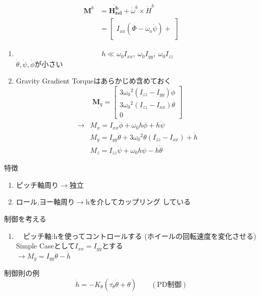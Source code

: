 \documentclass[class=article, crop=false, dvipdfmx]{standalone}
\begin{document}
\begin{align}
\bm{M}^b&=
\dot{\bm{H_{rel}^b}} +
\dot{\omega}^b \times \dot{H}^b\\
&=
\begin{bmatrix}
I_{xx}(\ddot{\Phi} -\omega_o\dot{\psi}) + 
\end{bmatrix}
\end{align}


\begin{enumerate}[label=仮定\maru{\theenumi}]
\item
\begin{equation}
h \ll \omega_0 I_{xx}, \ \omega_0 I_{yy}, \ \omega_0 I_{zz}
\end{equation}
$\dot{\theta}, \dot{\psi}, \dot{\phi}$が小さい

\item
Gravity Gradient Torqueはあらかじめ含めておく
\begin{equation}
\bm{M}_q = 
	\begin{bmatrix}
    3 {\omega_0}^2 (I_{zz} - I_{yy}) \phi \\
    3 {\omega_0}^2 (I_{zz} - I_{xx}) \theta \\
    0
    \end{bmatrix}
\end{equation}
\begin{align}
\rightarrow
& M_x = I_{xx} \ddot{\phi} + \omega_0 h \phi + h \dot{\psi} \\
& M_y = I_{yy} \ddot{\theta} + 3{\omega_0}^2 \theta (I_{zz} - I_{xx}) + \dot{h} \\
& M_z = I_{zz} \ddot{\psi} + \omega_0 h \psi - h \dot{\theta}
\end{align}
\end{enumerate}
特徴
\begin{enumerate}[label=\theenumi)]
\item ピッチ軸周り$\rightarrow$独立
\item ロール,ヨー軸周り$\rightarrow$hを介してカップリング
している
\end{enumerate}
制御を考える
\begin{enumerate}[label=(\theenumi)]%
\item　ピッチ軸:hを使ってコントロールする
(ホイールの回転速度を変化させる)\\
Simple Caseとして$I_{xx}=I_{yy}$とする\\
$\rightarrow M_y=I_{yy}\ddot{\theta}-\dot{h}$
\end{enumerate}
制御則の例
\begin{equation}
\dot{h}=-K_{\theta}(\tau_{\theta}\dot{\theta}+\theta)
\qquad(\text{PD制御})
\end{equation}
\end{document}
